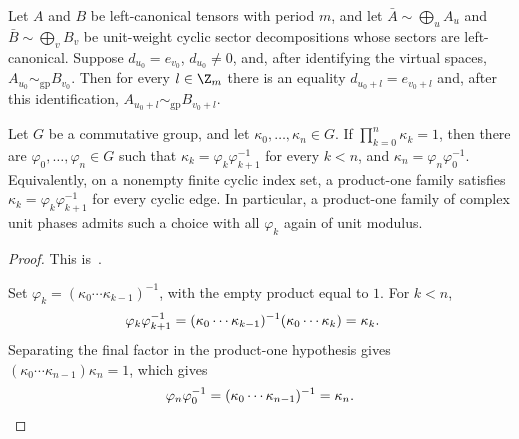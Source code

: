 \begin{lemma}\label{lem:sector_match_propagation}
    \leanok
    Let $A$ and $B$ be left-canonical tensors with period $m$, and let
    $\bar A\sim\bigoplus_uA_u$ and $\bar B\sim\bigoplus_vB_v$ be unit-weight
    cyclic sector decompositions whose sectors are left-canonical. Suppose
    $d_{u_0}=e_{v_0}$, $d_{u_0}\ne0$, and, after identifying the virtual spaces,
    $A_{u_0}\sim_{\mathrm{gp}}B_{v_0}$. Then for every $l\in\Z_m$ there
    is an equality $d_{u_0+l}=e_{v_0+l}$ and, after this identification,
    $A_{u_0+l}\sim_{\mathrm{gp}}B_{v_0+l}$.
\end{lemma}

\begin{lemma}\label{lem:finite_cycle_coboundary}
    \leanok

    Let $G$ be a commutative group, and let
    $\kappa_0,\ldots,\kappa_n\in G$. If
    $\prod_{k=0}^{n}\kappa_k=1$, then there are
    $\varphi_0,\ldots,\varphi_n\in G$ such that
    $\kappa_k=\varphi_k\varphi_{k+1}^{-1}$ for every $k<n$, and
    $\kappa_n=\varphi_n\varphi_0^{-1}$.
    Equivalently, on a nonempty finite cyclic index set, a product-one family
    satisfies $\kappa_k=\varphi_k\varphi_{k+1}^{-1}$ for every cyclic edge.
    In particular, a product-one family of complex unit phases admits such a
    choice with all $\varphi_k$ again of unit modulus.
\end{lemma}

\begin{proof}\leanok
    This is~\cite[``Finite-cycle coboundary'']{QICLean2026Blueprint}.

    Set $\varphi_k=(\kappa_0\cdots\kappa_{k-1})^{-1}$, with the empty product
    equal to $1$. For $k<n$,
    \begin{align}
        \varphi_k\varphi_{k+1}^{-1}
         & =
        (\kappa_0\cdots\kappa_{k-1})^{-1}
        (\kappa_0\cdots\kappa_k)
        =\kappa_k. \notag
    \end{align}
    Separating the final factor in the product-one hypothesis gives
    $(\kappa_0\cdots\kappa_{n-1})\kappa_n=1$, which gives
    \begin{align}
        \varphi_n\varphi_0^{-1}
        =
        (\kappa_0\cdots\kappa_{n-1})^{-1}
        =
        \kappa_n. \notag
    \end{align}
\end{proof}

